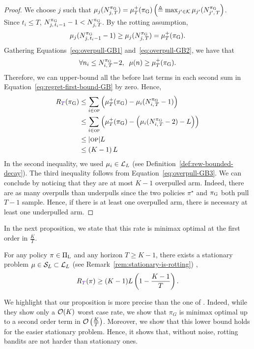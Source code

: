 \begin{proof}
We choose $j$ such that $ \mu_j(N_{j,\,T}^{\pi_{\rm G}}) = \mu^+_T(\pi_{\rm G}) \left(\triangleq \max_{j'\in \mathcal{K}} \mu_{j'}(N_{j',\,T}^{\pi_{\rm G}}\right)$. \\Since $t_i \leq T$, $N_{j,\,t_i-1}^{\pi_{\rm G}} - 1 < N_{j,\,T}^{\pi_{\rm G}}$. By the rotting assumption, 
\begin{equation}
\label{eq:overpull-GB2}
 \mu_j(N_{j,\,t_i-1}^{\pi_{\rm G}} - 1) \geq \mu_j(N_{j,\,T}^{\pi_{\rm G}}) = \mu^+_T(\pi_{\rm G}).
\end{equation}
%
Gathering Equations~\ref{eq:overpull-GB1} and~\ref{eq:overpull-GB2}, we have that 
\begin{equation}
\label{eq:overpull-GB3}
\forall n_i \leq N_{i,\,T}^{\pi_{\rm G}} \!-\! 2, \;\;  \mu(n) \geq \mu^+_T(\pi_{\rm G}).
\end{equation}
Therefore,  we can upper-bound all the before last terms in each second sum in Equation~\ref{eq:regret-first-bound-GB} by zero. Hence, 
\begin{align*}
\regret(\GB) &\leq \sum_{i\in \overpullSet} \pa{\mu^+_T(\GB) - \mu_i(\NiT^{\GB}-1)}\\
&\leq \sum_{i\in \overpullSet} \pa{\mu^+_T(\GB) - \pa{\mu_i(\NiT^{\GB}-2) - L}}\\
&\leq |\overpullSet| L \\
&\leq \pa{K-1} L
\end{align*}
In the second inequality, we used $\mu_i \in \mathcal{L}_L$ (see Definition~\ref{def:rew-bounded-decay}). The third inequality follows from Equation~\ref{eq:overpull-GB3}. We can conclude by noticing that they are at most $K-1$ overpulled arm. Indeed, there are as many overpulls than underpulls since the two policies $\pi^\star$ and $\pi_{\rm G}$ both pull $T-1$ sample. Hence, if there is at least one overpulled arm, there is necessary at least one underpulled arm. 
\end{proof}

In the next proposition, we state that this rate is minimax optimal at the first order in $\frac{K}{T}$.

\begin{proposition}
\label{prop:lb-noisefree}
For any policy $\pi\in \Pi_{\rm L}$ and any horizon $T \geq K-1$, there exists a stationary problem $\mu \in \mathcal{S}_{L} \subset \mathcal{L}_L$ (see Remark~\ref{rem:stationary-is-rotting}) , 
\[\regret (\pi) \geq (K-1)L \pa{1-\frac{K-1}{T}}. \]
\end{proposition}
We highlight that our proposition is more precise than the one of \citet{heidari2016tight}. Indeed, while they show only a $\mathcal{O}(K)$ worst case rate, we show that $\pi_G$ is minimax optimal up to a second order term in $\mathcal{O}\left(\frac{K}{T}\right)$. Moreover, we show that this lower bound holds for the easier stationary problem. Hence, it shows that, without noise, rotting bandits are not harder than stationary ones.

